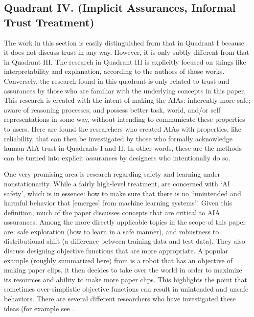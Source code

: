 \subsection{Quadrant IV. (Implicit Assurances, Informal Trust Treatment)}\label{sec:q4}
    The work in this section is easily distinguished from that in Quadrant I because it does not discuss trust in any way. However, it is only subtly different from that in Quadrant III. The research in Quadrant III is explicitly focused on things like interpretability and explanation, according to the authors of those works. Conversely, the research found in this quadrant is only related to trust and assurances by those who are familiar with the underlying concepts in this paper. This research is created with the intent of making the AIAs: inherently more safe; aware of reasoning processes; and possess better task, world, and/or self representations in some way, without intending to communicate these properties to users. 
Here are found the researchers who created AIAs with properties, like reliability, that can then be investigated by those who formally acknowledge human-AIA trust in Quadrants I and II. In other words, these are the methods can be turned into explicit assurances by designers who intentionally do so. 

One very promising area is research regarding safety and learning under nonstationarity. While a fairly high-level treatment, \citet{Amodei2016-xi} are concerned with `AI safety', which is in essence: how to make sure that there is no ``unintended and harmful behavior that [emerges] from machine learning systems''. Given this definition, much of the paper discusses concepts that are critical to AIA assurances. Among the more directly applicable topics in the scope of this paper are: safe exploration (how to learn in a safe manner), and robustness to distributional shift (a difference between training data and test data). They also discuss designing objective functions that are more appropriate. %
A popular example (roughly summarized here) from \citet{Bostrom2014-fz} is a robot that has an objective of making paper clips, it then decides to take over the world in order to maximize its resources and ability to make more paper clips. This highlights the point that sometimes over-simplistic objective functions can result in unintended and unsafe behaviors. There are several different researchers who have investigated these ideas (for example see \cite{Sugiyama2013-ci,Quinonero-Candela2009-fj,Hadfield-Menell2016-ws,Da_Veiga2012-gh,Garcia2015-rs}.

